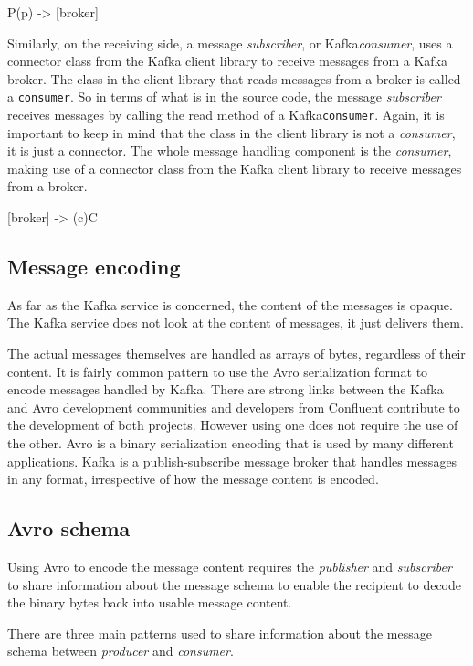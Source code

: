 \documentclass{article}
\newcommand{\avro} {Avro\xspace}
\newcommand{\kafka} {Kafka\xspace}
\newcommand{\kfconsumer} {\textit{consumer}\xspace}
\newcommand{\kfproducer} {\textit{producer}\xspace}
\newcommand{\kfpublisher} {\textit{publisher}\xspace}
\newcommand{\kfsubscriber} {\textit{subscriber}\xspace}
\newcommand{\confluent} {Confluent\xspace}
\begin{document}
   {P(p)} -> [broker]

Similarly, on the receiving side, a message \kfsubscriber, or \kafka \kfconsumer, uses a connector class from the \kafka client library to receive messages from a \kafka broker.
The class in the client library that reads messages from a broker is called a \texttt{consumer}. So in terms of what is in the source code, the message \kfsubscriber receives messages by calling the read method of a \kafka \texttt{consumer}.
Again, it is important to keep in mind that the class in the client library is not a \kfconsumer, it is just a connector. The whole message handling component is the \kfconsumer, making use of a connector class from the \kafka client library to receive messages from a broker.

   [broker] -> {(c)C}

\subsection{Message encoding}
\label{kafka-encoding}

As far as the \kafka service is concerned, the content of the messages is opaque. The \kafka service does not look at the content of messages, it just delivers them.

The actual messages themselves are handled as arrays of bytes, regardless of their content.
It is fairly common pattern to use the 
\avro serialization format to encode messages handled by \kafka.
There are strong links between the \kafka and \avro development 
communities and developers from \confluent contribute to the development of both projects.
However using one does not require the use of the other.
\avro is a binary serialization encoding that is used by many different applications.
\kafka is a publish-subscribe message broker that handles messages in any format, irrespective of how the message content is encoded.

\subsection{Avro schema}
\label{avro-schema}

Using \avro to encode the message content requires the \kfpublisher and \kfsubscriber to share information about the message schema to enable the recipient to decode the binary bytes back into usable message content.

There are three main patterns used to share information about the message schema between \kfproducer and \kfconsumer.
\end{document}
